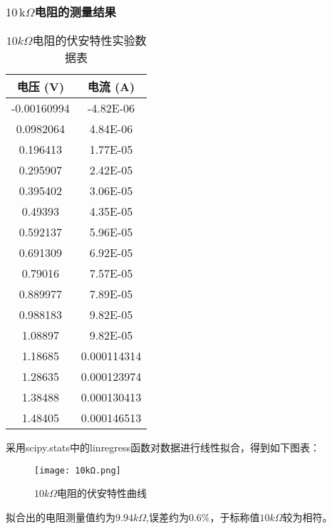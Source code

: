\documentclass[UTF-8,twoside,cs4size]{ctexart}
\begin{document}
    \subsubsection{$ 10\,\mathrm k\Omega $电阻的测量结果}
    \begin{table}[htbp]
        \centering
        \begin{tabular}{|c|c|}
        \hline
        电压 (V) & 电流 (A) \\ \hline
        -0.00160994 & -4.82E-06 \\ \hline
        0.0982064  & 4.84E-06  \\ \hline
        0.196413   & 1.77E-05  \\ \hline
        0.295907   & 2.42E-05  \\ \hline
        0.395402   & 3.06E-05  \\ \hline
        0.49393    & 4.35E-05  \\ \hline
        0.592137   & 5.96E-05  \\ \hline
        0.691309   & 6.92E-05  \\ \hline
        0.79016    & 7.57E-05  \\ \hline
        0.889977   & 7.89E-05  \\ \hline
        0.988183   & 9.82E-05  \\ \hline
        1.08897    & 9.82E-05  \\ \hline
        1.18685    & 0.000114314 \\ \hline
        1.28635    & 0.000123974 \\ \hline
        1.38488    & 0.000130413 \\ \hline
        1.48405    & 0.000146513 \\ \hline
        \end{tabular}
        \caption{$10k\Omega$电阻的伏安特性实验数据表}
        \end{table}
        采用scipy.stats中的linregress函数对数据进行线性拟合，得到如下图表：
        \begin{figure}[!h]
            \centering
            \texttt{[image: 10kΩ.png]}
            \caption{$10k\Omega$电阻的伏安特性曲线}
        \end{figure}
        \newpage
        拟合出的电阻测量值约为$9.94k\Omega$,误差约为$0.6\%$，于标称值$10k\Omega$较为相符。
\end{document}
